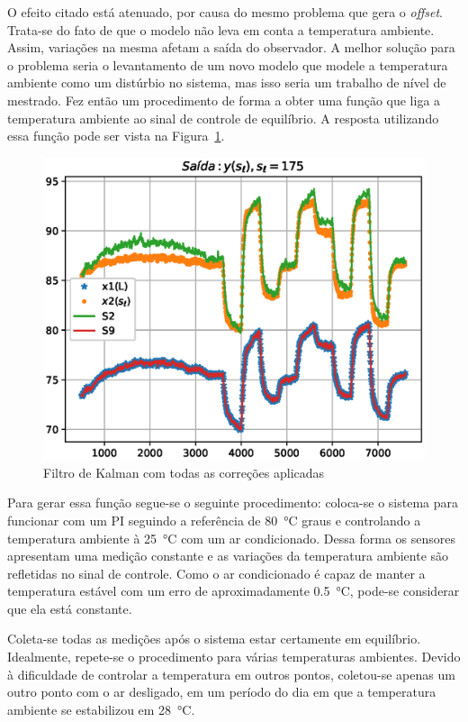 O efeito citado está atenuado, por causa do mesmo problema que gera o
\textit{offset}. Trata-se do fato de que o modelo não leva em conta a
temperatura ambiente. Assim, variações na mesma afetam a saída do observador. A
melhor solução para o problema seria o levantamento de um novo modelo que modele
a temperatura ambiente como um distúrbio no sistema, mas isso seria um trabalho
de nível de mestrado. Fez então um procedimento de forma a obter uma função que
liga a temperatura ambiente ao sinal de controle de equilíbrio. A resposta
utilizando essa função pode ser vista na Figura~\ref{fig:kalman-final}.

\begin{figure}[ht!]
	\centering
	\captionsetup{justification=centering}
	\includegraphics[height=0.5\linewidth]{imgs/kalman-final}
	\caption{Filtro de Kalman com todas as correções aplicadas}%
	\label{fig:kalman-final}
\end{figure}

Para gerar essa função segue-se o seguinte procedimento: coloca-se o sistema
para funcionar com um PI seguindo a referência de \SI{80}{\degreeCelsius} graus
e controlando a temperatura ambiente à \SI{25}{\degreeCelsius} com um ar
condicionado. Dessa forma os sensores apresentam uma medição constante e as
variações da temperatura ambiente são refletidas no sinal de controle. Como o ar
condicionado é capaz de manter a temperatura estável com um erro de
aproximadamente \SI{0.5}{\degreeCelsius}, pode-se considerar que ela está
constante.

Coleta-se todas as medições após o sistema estar certamente em equilíbrio.
Idealmente, repete-se o procedimento para várias temperaturas ambientes. Devido
à dificuldade de controlar a temperatura em outros pontos, coletou-se apenas um
outro ponto com o ar desligado, em um período do dia em que a temperatura
ambiente se estabilizou em \SI{28}{\degreeCelsius}.

